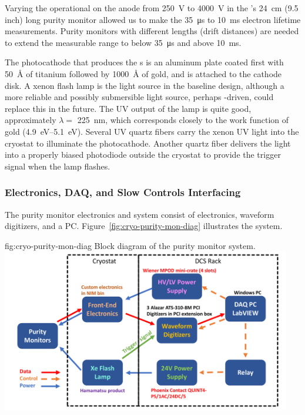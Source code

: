 Varying the operational  on the anode from \SI{250}{V} to \SI{4000}{V} in the 's \SI{24}{cm} (9.5 inch) long purity monitor allowed us to make the \SI{35}{\micro\second} to \SI{10}{\milli\second} electron lifetime measurements. 
Purity monitors with different lengths (drift distances) are needed to extend the measurable range to below \SI{35}{\micro\second} and above  \SI{10}{\milli\second}.

The photocathode that produces the \phel{}s is an aluminum plate coated first with \SI{50}{\angstrom} of titanium followed by \SI{1000}{\angstrom} of gold, and is attached to the cathode disk.
A xenon flash lamp is the light source in the baseline design, although %
a more reliable and possibly submersible light source, perhaps -driven, could replace this in the future. The UV output of the lamp is quite good, approximately $\lambda=$ \SI{225}{\nano\meter}, which corresponds closely to the work function of gold (\SIrange{4.9}{5.1}{\eV}). 
Several UV quartz fibers carry the xenon UV light into the cryostat to illuminate the %
photocathode.   Another quartz fiber delivers the light into a properly biased photodiode outside the cryostat to provide the trigger signal when the lamp flashes. 



\subsubsection{Electronics, DAQ, and Slow Controls Interfacing}
The purity monitor electronics and  system consist of  electronics, waveform digitizers, and a  PC.  Figure~\ref{fig:cryo-purity-mon-diag} %
illustrates the system.

\begin{dunefigure}{fig:cryo-purity-mon-diag}
  {Block diagram of the purity monitor system.}
  \includegraphics[width=0.95\textwidth]{graphics/PrMon_BlockDiagram_v2.pdf}
\end{dunefigure}


